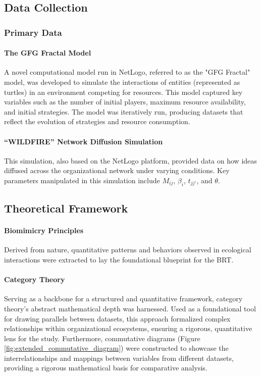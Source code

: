 \documentclass[sn-nature]{sn-jnl}%
\theoremstyle{thmstyleone}%
\theoremstyle{thmstyletwo}%
\theoremstyle{thmstylethree}%
\begin{document}
\subsection{Data Collection}
\subsubsection{Primary Data}
\paragraph{The GFG Fractal Model}
A novel computational model run in NetLogo\cite{wilensky_netlogo_1999-1}, referred to as the "GFG Fractal" model, was developed to simulate the interactions of entities (represented as turtles) in an environment competing for resources. This model captured key variables such as the number of initial players, maximum resource availability, and initial strategies. The model was iteratively run, producing datasets that reflect the evolution of strategies and resource consumption.

\paragraph{\enquote{WILDFIRE} Network Diffusion Simulation} This simulation, also based on the NetLogo platform\cite{wilensky_netlogo_1997}, provided data on how ideas diffused across the organizational network under varying conditions. Key parameters manipulated in this simulation include \( M_{ij} \), \( \beta_i \), \( t_{jj'} \), and \( \theta \).


\subsection{Theoretical Framework}

\paragraph{Biomimicry Principles} Derived from nature, quantitative patterns and behaviors observed in ecological interactions were extracted to lay the foundational blueprint for the BRT\cite{guichard_meta-ecosystem_2021}.

\paragraph{Category Theory} Serving as a backbone for a structured and quantitative framework, category theory's abstract mathematical depth was harnessed. Used as a foundational tool for drawing parallels between datasets, this approach formalized complex relationships within organizational ecosystems, ensuring a rigorous, quantitative lens for the study. Furthermore, commutative diagrams (Figure \ref{fig:extended_commutative_diagram}) were constructed to showcase the interrelationships and mappings between variables from different datasets, providing a rigorous mathematical basis for comparative analysis\cite{spivak_category_2014}\cite{fong_invitation_2019}.
\end{document}
